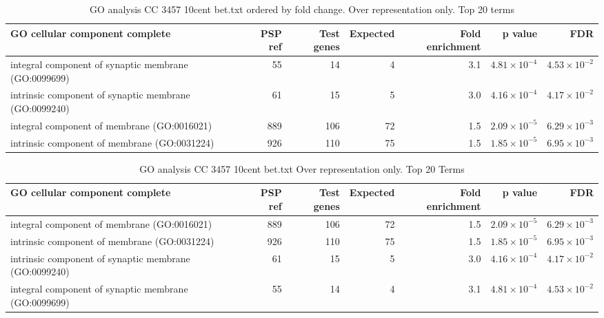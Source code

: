 \begin{table}[ht]
\centering
\begin{adjustbox}{width=\textwidth}


\begin{tabular}{lrrrrrr}
  \hline
GO cellular component complete & PSP ref & Test genes & Expected & Fold enrichment & p value & FDR \\ 
  \hline
integral component of synaptic membrane (GO:0099699) & 55 & 14 & 4 & 3.1 & $4.81 \times 10^{-4}$ & $4.53 \times 10^{-2}$ \\ 
  intrinsic component of synaptic membrane (GO:0099240) & 61 & 15 & 5 & 3.0 & $4.16 \times 10^{-4}$ & $4.17 \times 10^{-2}$ \\ 
  integral component of membrane (GO:0016021) & 889 & 106 & 72 & 1.5 & $2.09 \times 10^{-5}$ & $6.29 \times 10^{-3}$ \\ 
  intrinsic component of membrane (GO:0031224) & 926 & 110 & 75 & 1.5 & $1.85 \times 10^{-5}$ & $6.95 \times 10^{-3}$ \\ 
   \hline
\end{tabular}
\end{adjustbox}
\caption{GO analysis CC 3457 10cent bet.txt ordered by fold change. Over representation only. Top 20 terms} 
\label{tab:GO analysis CC 3457 10cent bet.txt ordered by fold change. Over representation only. Top 20 terms}
\end{table}

\begin{table}[ht]
\centering
\begin{adjustbox}{width=\textwidth}

\begin{tabular}{lrrrrrr}
  \hline
GO cellular component complete & PSP ref & Test genes & Expected & Fold enrichment & p value & FDR \\ 
  \hline
integral component of membrane (GO:0016021) & 889 & 106 & 72 & 1.5 & $2.09 \times 10^{-5}$ & $6.29 \times 10^{-3}$ \\ 
  intrinsic component of membrane (GO:0031224) & 926 & 110 & 75 & 1.5 & $1.85 \times 10^{-5}$ & $6.95 \times 10^{-3}$ \\ 
  intrinsic component of synaptic membrane (GO:0099240) & 61 & 15 & 5 & 3.0 & $4.16 \times 10^{-4}$ & $4.17 \times 10^{-2}$ \\ 
  integral component of synaptic membrane (GO:0099699) & 55 & 14 & 4 & 3.1 & $4.81 \times 10^{-4}$ & $4.53 \times 10^{-2}$ \\ 
   \hline
\end{tabular}
\end{adjustbox}
\caption{GO analysis CC 3457 10cent bet.txt Over representation only. Top 20 Terms} 
\label{tab:GO analysis CC 3457 10cent bet.txt Over representation only. Top 20 Terms}
\end{table}

